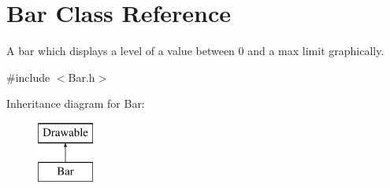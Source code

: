 \hypertarget{class_bar}{}\section{Bar Class Reference}
\label{class_bar}


A bar which displays a level of a value between 0 and a max limit graphically.  




{\ttfamily \#include $<$Bar.\+h$>$}

Inheritance diagram for Bar\+:\begin{figure}[H]
\begin{center}
\leavevmode
\includegraphics[height=2.000000cm]{class_bar}
\end{center}
\end{figure}
